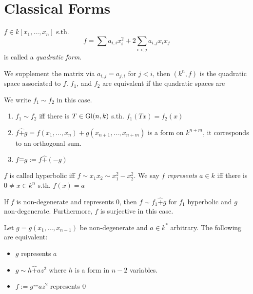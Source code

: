 \section{Classical Forms}
\begin{definition}
  $f\in k[x_1, \ldots, x_n]$ s.th.
  $$f = \sum a_{i,i}x_i^2 + 2\sum_{i<j}a_{i,j}x_ix_j$$
  is called a {\em quadratic form}.

  We supplement the matrix via $a_{i,j} = a_{j,i}$ for $j<i$, then
  $(k^n, f)$ is the quadratic space associated to $f$. $f_1$, and $f_2$
  are equivalent if the quadratic spaces are

  We write $f_1\sim f_2$ in this case.
\end{definition}

\begin{remark}
   \begin{enumerate}
     \item $f_1 \sim f_2$ iff there is $T\in \mathop{\rm Gl}\nolimits(n, k)$ s.th. $f_1(T x) = f_2(x)$
     \item $f \hat + g = f(x_1, \ldots, x_n) + g(x_{n+1}, \ldots, x_{n+m})$ is
       a form on $k^{n+m}$, it corresponds to an orthogonal sum.
     \item $f \hat - g := f\hat +(-g)$
   \end{enumerate}
\end{remark}

\begin{definition}
  $f$ is called hyperbolic iff $f\sim x_1x_2 \sim x_1^2-x_2^2$.
  We say {\em $f$ represents $a\in k$} iff there is $0\ne x\in k^n$ s.th.
  $f(x) = a$
\end{definition}

\begin{proposition}
  If $f$ is non-degenerate and represents $0$, then $f\sim f_1 \hat + g$
  for $f_1$ hyperbolic and $g$ non-degenerate. Furthermore, $f$ is surjective
  in this case.
\end{proposition}

\begin{korollar}
  Let $g = g(x_1, \ldots, x_{n-1})$ be non-degenerate and $a\in k^*$ arbitrary.
  The following are equivalent:
  \begin{itemize}
    \item $g$ represents $a$
    \item $g\sim h \hat + az^2$ where $h$ is a form in $n-2$ variables.
    \item $f := g\hat - az^2$ represents $0$
  \end{itemize}
\end{korollar}

